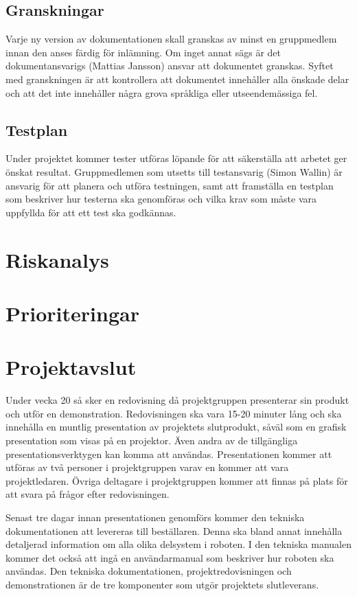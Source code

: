 \documentclass[a4paper,12pt]{article}
\begin{document}
\subsection{Granskningar}
Varje ny version av dokumentationen skall granskas av minst en gruppmedlem innan den anses färdig för inlämning. Om inget annat sägs är det dokumentansvarigs (Mattias Jansson) ansvar att dokumentet granskas. Syftet med granskningen är att kontrollera att dokumentet innehåller alla önskade delar och att det inte innehåller några grova språkliga eller utseendemässiga fel.

\subsection{Testplan}
Under projektet kommer tester utföras löpande för att säkerställa att arbetet ger önskat resultat. Gruppmedlemen som utsetts till testansvarig (Simon Wallin) är ansvarig för att planera och utföra testningen, samt att framställa en testplan som beskriver hur testerna ska genomföras och vilka krav som måste vara uppfyllda för att ett test ska godkännas.


\section{Riskanalys} %

\section{Prioriteringar}


\section{Projektavslut} %

Under vecka 20 så sker en redovisning då projektgruppen presenterar sin produkt och utför en demonstration. Redovisningen ska vara 15-20 minuter lång och ska innehålla en muntlig presentation av projektets slutprodukt, såväl som en grafisk presentation som visas på en projektor. Även andra av de tillgängliga presentationsverktygen kan komma att användas. Presentationen kommer att utföras av två personer i projektgruppen varav en kommer att vara projektledaren. Övriga deltagare i projektgruppen kommer att finnas på plats för att svara på frågor efter redovisningen.

Senast tre dagar innan presentationen genomförs kommer den tekniska dokumentationen att levereras till beställaren. Denna ska bland annat innehålla detaljerad information om alla olika delsystem i roboten. I den tekniska manualen kommer det också att ingå en användarmanual som beskriver hur roboten ska användas. Den tekniska dokumentationen, projektredovisningen och demonstrationen är de tre komponenter som utgör projektets slutleverans. 
\end{document}
